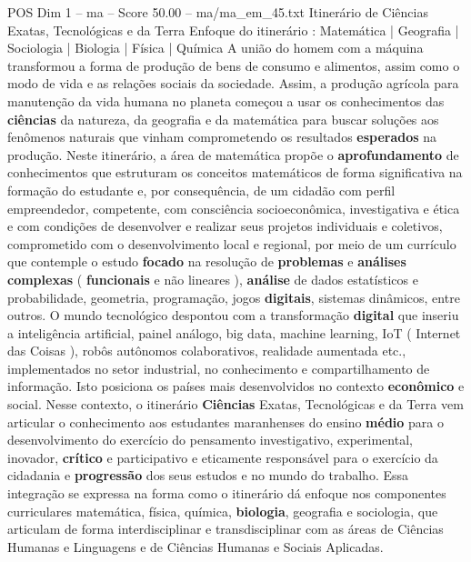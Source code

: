 \begin{textsample}{POS Dim 1 – ma – Score 50.00 – ma/ma\_em\_45.txt}  \label{ex:f1_pos_069}
Itinerário de Ciências Exatas, Tecnológicas e da Terra Enfoque do itinerário : Matemática | Geografia | Sociologia | Biologia | Física | Química A união do homem com a máquina transformou a forma de produção de bens de consumo e alimentos, assim como o modo de vida e as relações sociais da sociedade.
Assim, a produção agrícola para manutenção da vida humana no planeta começou a usar os conhecimentos das \textbf{ciências} da natureza, da geografia e da matemática para buscar soluções aos fenômenos naturais que vinham comprometendo os resultados \textbf{esperados} na produção.
Neste itinerário, a área de matemática propõe o \textbf{aprofundamento} de conhecimentos que estruturam os conceitos matemáticos de forma significativa na formação do estudante e, por consequência, de um cidadão com perfil empreendedor, competente, com consciência socioeconômica, investigativa e ética e com condições de desenvolver e realizar seus projetos individuais e coletivos, comprometido com o desenvolvimento local e regional, por meio de um currículo que contemple o estudo \textbf{focado} na resolução de \textbf{problemas} e \textbf{análises} \textbf{complexas} ( \textbf{funcionais} e não lineares ), \textbf{análise} de dados estatísticos e probabilidade, geometria, programação, jogos \textbf{digitais}, sistemas dinâmicos, entre outros.
O mundo tecnológico despontou com a transformação \textbf{digital} que inseriu a inteligência artificial, painel análogo, big data, machine learning, IoT ( Internet das Coisas ), robôs autônomos colaborativos, realidade aumentada etc., implementados no setor industrial, no conhecimento e compartilhamento de informação.
Isto posiciona os países mais desenvolvidos no contexto \textbf{econômico} e social.
Nesse contexto, o itinerário \textbf{Ciências} Exatas, Tecnológicas e da Terra vem articular o conhecimento aos estudantes maranhenses do ensino \textbf{médio} para o desenvolvimento do exercício do pensamento investigativo, experimental, inovador, \textbf{crítico} e participativo e eticamente responsável para o exercício da cidadania e \textbf{progressão} dos seus estudos e no mundo do trabalho.
Essa integração se expressa na forma como o itinerário dá enfoque nos componentes curriculares matemática, física, química, \textbf{biologia}, geografia e sociologia, que articulam de forma interdisciplinar e transdisciplinar com as áreas de Ciências Humanas e Linguagens e de Ciências Humanas e Sociais Aplicadas.

\end{textsample}
